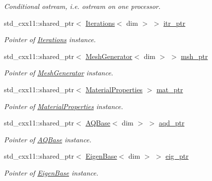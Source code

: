 \begin{DoxyCompactItemize}
\begin{DoxyCompactList}\small\item\em Conditional ostream, i.\+e. ostream on one processor. \end{DoxyCompactList}\item 
std\+\_\+cxx11\+::shared\+\_\+ptr$<$ \hyperlink{class_iterations}{Iterations}$<$ dim $>$ $>$ \hyperlink{class_bart_driver_ae07e7a592dd255d69685f17d98a2ecc6}{itr\+\_\+ptr}
\begin{DoxyCompactList}\small\item\em Pointer of \hyperlink{class_iterations}{Iterations} instance. \end{DoxyCompactList}\item 
std\+\_\+cxx11\+::shared\+\_\+ptr$<$ \hyperlink{class_mesh_generator}{Mesh\+Generator}$<$ dim $>$ $>$ \hyperlink{class_bart_driver_a976c3ba1c98180dced85019dfd56e225}{msh\+\_\+ptr}
\begin{DoxyCompactList}\small\item\em Pointer of \hyperlink{class_mesh_generator}{Mesh\+Generator} instance. \end{DoxyCompactList}\item 
std\+\_\+cxx11\+::shared\+\_\+ptr$<$ \hyperlink{class_material_properties}{Material\+Properties} $>$ \hyperlink{class_bart_driver_aef9abac579c212463a6790a0e39e6429}{mat\+\_\+ptr}
\begin{DoxyCompactList}\small\item\em Pointer of \hyperlink{class_material_properties}{Material\+Properties} instance. \end{DoxyCompactList}\item 
std\+\_\+cxx11\+::shared\+\_\+ptr$<$ \hyperlink{class_a_q_base}{A\+Q\+Base}$<$ dim $>$ $>$ \hyperlink{class_bart_driver_a818149e4acfe5a7108ef42938650ff11}{aqd\+\_\+ptr}
\begin{DoxyCompactList}\small\item\em Pointer of \hyperlink{class_a_q_base}{A\+Q\+Base} instance. \end{DoxyCompactList}\item 
std\+\_\+cxx11\+::shared\+\_\+ptr$<$ \hyperlink{class_eigen_base}{Eigen\+Base}$<$ dim $>$ $>$ \hyperlink{class_bart_driver_a90adc0f013f07a10c5d423e3506bd589}{eig\+\_\+ptr}
\begin{DoxyCompactList}\small\item\em Pointer of \hyperlink{class_eigen_base}{Eigen\+Base} instance. \end{DoxyCompactList}\item 

\end{DoxyCompactItemize}
